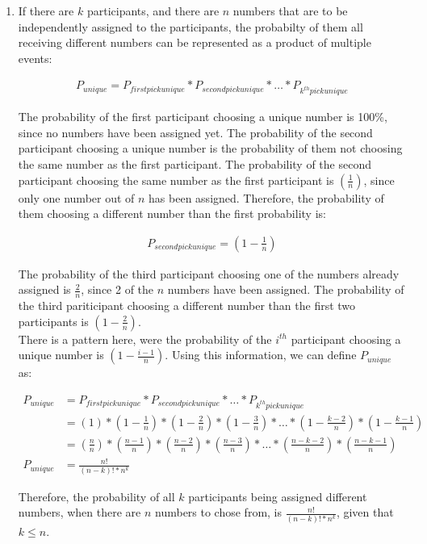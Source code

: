 \documentclass[11pt]{article}
\theoremstyle{definition}
\begin{document}
\begin{enumerate}
\begin{enumerate}
\item If there are $k$ participants, and there are $n$ numbers that are to be independently assigned to the participants, the probabilty of them all receiving different numbers
can be represented as a product of multiple events:

\begin{align*}
P_{unique} = P_{first pick unique} * P_{second pick unique} * \ldots * P_{k^{th} pick unique}
\end{align*}

The probability of the first participant choosing a unique number is 100\%, since no numbers have been assigned yet. The probability of the second participant choosing a unique
number is the probability of them not choosing the same number as the first participant. The probability of the second participant choosing the same number as the first participant
is $( \frac{1}{n})$, since only one number out of $n$ has been assigned. Therefore, the probability of them choosing a different number than the first probability is:

\begin{align*}
P_{second pick unique} = (1 - \frac{1}{n})
\end{align*}

The probability of the third participant choosing one of the numbers already assigned is $\frac{2}{n}$, since 2 of the $n$ numbers have been assigned. The probability of the third pariticipant
choosing a different number than the first two participants is $(1 - \frac{2}{n})$.\\

There is a pattern here, were the probability of the $i^{th}$ participant choosing a unique number is $(1 - \frac{i-1}{n})$. Using this information, we can define $P_{unique}$ as:

\begin{align*}
P_{unique} &= P_{first pick unique} * P_{second pick unique} * \ldots * P_{k^{th} pick unique} \\ 
&= (1) * (1 - \frac{1}{n}) * (1 - \frac{2}{n}) * (1 - \frac{3}{n}) * \ldots * (1 - \frac{k - 2}{n}) * (1 - \frac{k - 1}{n})\\
&= (\frac{n}{n}) * (\frac{n - 1}{n}) * (\frac{n - 2}{n}) * (\frac{n - 3}{n}) * \ldots * (\frac{n - k - 2}{n}) * (\frac{n - k - 1}{n})\\
P_{unique} &= \frac{n!}{(n - k)! * n^k}
\end{align*}

Therefore, the probability of all $k$ participants being assigned different numbers, when there are $n$ numbers to chose from, is $\frac{n!}{(n - k)! * n^k}$, given that $k \leq n$.


\end{enumerate}
\end{enumerate}
\end{document}
